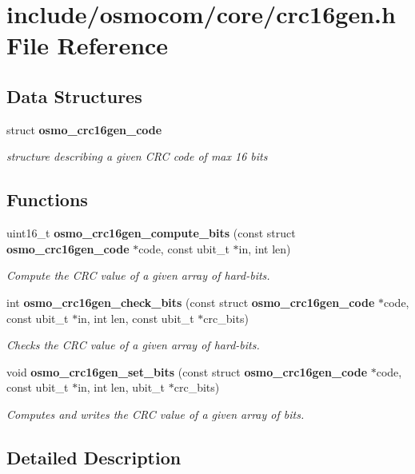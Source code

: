 \section{include/osmocom/core/crc16gen.h File Reference}
\label{crc16gen_8h}
\subsection*{Data Structures}
\begin{DoxyCompactItemize}
\item 
struct {\bf osmo\_\-crc16gen\_\-code}
\begin{DoxyCompactList}\small\item\em structure describing a given CRC code of max 16 bits \item\end{DoxyCompactList}\end{DoxyCompactItemize}
\subsection*{Functions}
\begin{DoxyCompactItemize}
\item 
uint16\_\-t {\bf osmo\_\-crc16gen\_\-compute\_\-bits} (const struct {\bf osmo\_\-crc16gen\_\-code} $\ast$code, const ubit\_\-t $\ast$in, int len)
\begin{DoxyCompactList}\small\item\em Compute the CRC value of a given array of hard-\/bits. \item\end{DoxyCompactList}\item 
int {\bf osmo\_\-crc16gen\_\-check\_\-bits} (const struct {\bf osmo\_\-crc16gen\_\-code} $\ast$code, const ubit\_\-t $\ast$in, int len, const ubit\_\-t $\ast$crc\_\-bits)
\begin{DoxyCompactList}\small\item\em Checks the CRC value of a given array of hard-\/bits. \item\end{DoxyCompactList}\item 
void {\bf osmo\_\-crc16gen\_\-set\_\-bits} (const struct {\bf osmo\_\-crc16gen\_\-code} $\ast$code, const ubit\_\-t $\ast$in, int len, ubit\_\-t $\ast$crc\_\-bits)
\begin{DoxyCompactList}\small\item\em Computes and writes the CRC value of a given array of bits. \item\end{DoxyCompactList}\end{DoxyCompactItemize}


\subsection{Detailed Description}
